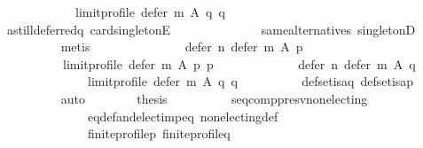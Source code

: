 \begin{isabellebody}
\ \ \ \ \ \ \ \ \ \ \ \ {\isacharparenleft}{\kern0pt}limit{\isacharunderscore}{\kern0pt}profile\ {\isacharparenleft}{\kern0pt}defer\ m\ A\ q{\isacharparenright}{\kern0pt}\ q{\isacharparenright}{\kern0pt}{\isachardoublequoteclose}\isanewline
\ \ \ \ \ \ \ \ \isamarkupfalse%
\ a{\isacharunderscore}{\kern0pt}still{\isacharunderscore}{\kern0pt}deferred{\isacharunderscore}{\kern0pt}q\ card{\isacharunderscore}{\kern0pt}{}{\isacharunderscore}{\kern0pt}singletonE\isanewline
\ \ \ \ \ \ \ \ \ \ \ \ \ \ same{\isacharunderscore}{\kern0pt}alternatives\ singletonD\isanewline
\ \ \ \ \ \ \ \ \isamarkupfalse%
\ metis\isanewline
\ \ \ \ \ \ \isamarkupfalse%
\isanewline
\ \ \ \ \ \ \ \ {\isachardoublequoteopen}defer\ n\ {\isacharparenleft}{\kern0pt}defer\ m\ A\ p{\isacharparenright}{\kern0pt}\isanewline
\ \ \ \ \ \ \ \ \ \ {\isacharparenleft}{\kern0pt}limit{\isacharunderscore}{\kern0pt}profile\ {\isacharparenleft}{\kern0pt}defer\ m\ A\ p{\isacharparenright}{\kern0pt}\ p{\isacharparenright}{\kern0pt}\ {\isacharequal}{\kern0pt}\isanewline
\ \ \ \ \ \ \ \ \ \ \ \ defer\ n\ {\isacharparenleft}{\kern0pt}defer\ m\ A\ q{\isacharparenright}{\kern0pt}\isanewline
\ \ \ \ \ \ \ \ \ \ \ \ \ \ {\isacharparenleft}{\kern0pt}limit{\isacharunderscore}{\kern0pt}profile\ {\isacharparenleft}{\kern0pt}defer\ m\ A\ q{\isacharparenright}{\kern0pt}\ q{\isacharparenright}{\kern0pt}{\isachardoublequoteclose}\isanewline
\ \ \ \ \ \ \ \ \isamarkupfalse%
\ def{\isacharunderscore}{\kern0pt}set{\isacharunderscore}{\kern0pt}is{\isacharunderscore}{\kern0pt}a{\isacharunderscore}{\kern0pt}q\ def{\isacharunderscore}{\kern0pt}set{\isacharunderscore}{\kern0pt}is{\isacharunderscore}{\kern0pt}a{\isacharunderscore}{\kern0pt}p\isanewline
\ \ \ \ \ \ \ \ \isamarkupfalse%
\ auto\isanewline
\ \ \ \ \ \ \isamarkupfalse%
\ {\isacharquery}{\kern0pt}thesis\isanewline
\ \ \ \ \ \ \ \ \isamarkupfalse%
\ seq{\isacharunderscore}{\kern0pt}comp{\isacharunderscore}{\kern0pt}presv{\isacharunderscore}{\kern0pt}non{\isacharunderscore}{\kern0pt}electing\isanewline
\ \ \ \ \ \ \ \ \ \ \ \ \ \ eq{\isacharunderscore}{\kern0pt}def{\isacharunderscore}{\kern0pt}and{\isacharunderscore}{\kern0pt}elect{\isacharunderscore}{\kern0pt}imp{\isacharunderscore}{\kern0pt}eq\ non{\isacharunderscore}{\kern0pt}electing{\isacharunderscore}{\kern0pt}def\isanewline
\ \ \ \ \ \ \ \ \ \ \ \ \ \ finite{\isacharunderscore}{\kern0pt}profile{\isacharunderscore}{\kern0pt}p\ finite{\isacharunderscore}{\kern0pt}profile{\isacharunderscore}{\kern0pt}q\isanewline

\end{isabellebody}
